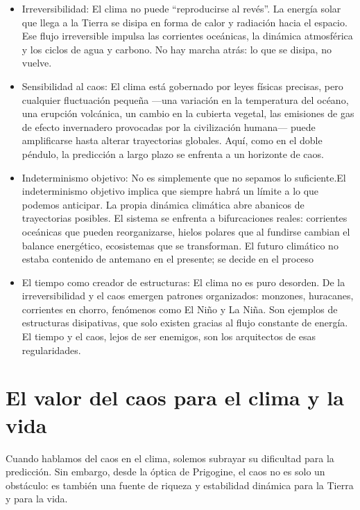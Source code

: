 \documentclass[
  10pt,
  a4paper,
  DIV=11,
  numbers=noendperiod,
  open=any]{scrreprt}
\numberwithin{equation}{chapter}
\numberwithin{equation}{section}
\renewcommand{\[}{\begin{equation}}
\renewcommand{\]}{\end{equation}}
\begin{document}
\begin{itemize}
\item
  Irreversibilidad: El clima no puede ``reproducirse al revés''. La
  energía solar que llega a la Tierra se disipa en forma de calor y
  radiación hacia el espacio. Ese flujo irreversible impulsa las
  corrientes oceánicas, la dinámica atmosférica y los ciclos de agua y
  carbono. No hay marcha atrás: lo que se disipa, no vuelve.
\item
  Sensibilidad al caos: El clima está gobernado por leyes físicas
  precisas, pero cualquier fluctuación pequeña ---una variación en la
  temperatura del océano, una erupción volcánica, un cambio en la
  cubierta vegetal, las emisiones de gas de efecto invernadero
  provocadas por la civilización humana--- puede amplificarse hasta
  alterar trayectorias globales. Aquí, como en el doble péndulo, la
  predicción a largo plazo se enfrenta a un horizonte de caos.
\item
  Indeterminismo objetivo: No es simplemente que no sepamos lo
  suficiente.El indeterminismo objetivo implica que siempre habrá un
  límite a lo que podemos anticipar. La propia dinámica climática abre
  abanicos de trayectorias posibles. El sistema se enfrenta a
  bifurcaciones reales: corrientes oceánicas que pueden reorganizarse,
  hielos polares que al fundirse cambian el balance energético,
  ecosistemas que se transforman. El futuro climático no estaba
  contenido de antemano en el presente; se decide en el proceso
\item
  El tiempo como creador de estructuras: El clima no es puro desorden.
  De la irreversibilidad y el caos emergen patrones organizados:
  monzones, huracanes, corrientes en chorro, fenómenos como El Niño y La
  Niña. Son ejemplos de estructuras disipativas, que solo existen
  gracias al flujo constante de energía. El tiempo y el caos, lejos de
  ser enemigos, son los arquitectos de esas regularidades.
\end{itemize}

\section{El valor del caos para el clima y la
vida}\label{el-valor-del-caos-para-el-clima-y-la-vida}

Cuando hablamos del caos en el clima, solemos subrayar su dificultad
para la predicción. Sin embargo, desde la óptica de Prigogine, el caos
no es solo un obstáculo: es también una fuente de riqueza y estabilidad
dinámica para la Tierra y para la vida.
\end{document}
